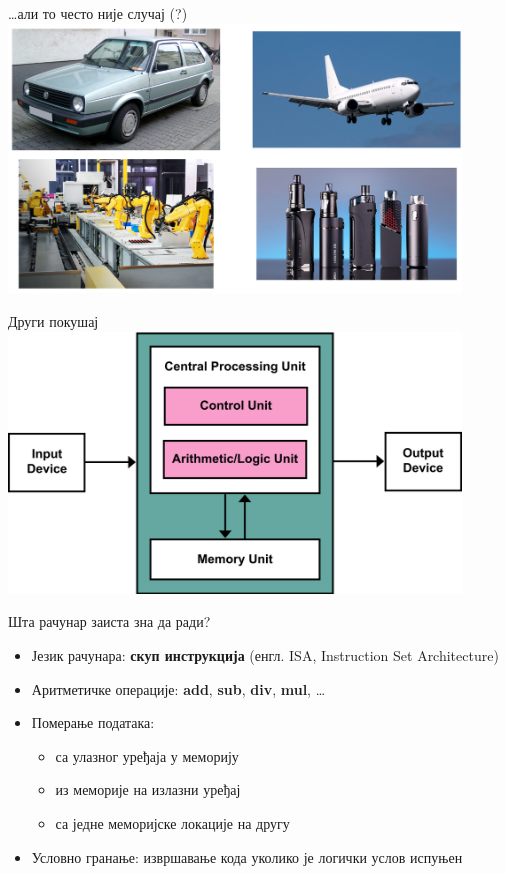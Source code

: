 \documentclass[xcolor=table]{beamer}
\begin{document}
    \begin{frame}{…али то често није случај (?)}
        \centering
        \includegraphics[height=0.8\textheight,width=0.9\textwidth,keepaspectratio]{images/embedded.png}
    \end{frame}
    
    \begin{frame}{Други покушај}
        \centering
        \includegraphics[height=0.8\textheight,width=0.9\textwidth,keepaspectratio]{images/von_neumann.png}
    \end{frame}
    
    \begin{frame}{Шта рачунар заиста зна да ради?}
        \begin{itemize}
            \item Језик рачунара: \textbf{скуп инструкција} (енгл. ISA, Instruction Set Architecture)
            \item Аритметичке операције: \textbf{add}, \textbf{sub}, \textbf{div}, \textbf{mul}, …
            \item Померање података:
            \begin{itemize}
                \item са улазног уређаја у меморију
                \item из меморије на излазни уређај
                \item са једне меморијске локације на другу
            \end{itemize}
            \item Условно гранање: извршавање кода уколико је логички услов испуњен
        \end{itemize}
    \end{frame}
    
\end{document}
